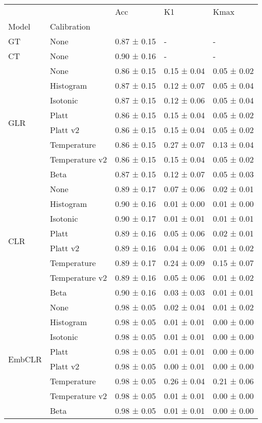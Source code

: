\begin{tabular}{lllll}
\toprule
 &  & Acc & K1 & Kmax \\
Model & Calibration &  &  &  \\
\midrule
GT & None & 0.87 ± 0.15 & - & - \\
\cline{1-5}
CT & None & 0.90 ± 0.16 & - & - \\
\cline{1-5}
\multirow[t]{8}{*}{GLR} & None & 0.86 ± 0.15 & 0.15 ± 0.04 & 0.05 ± 0.02 \\
 & Histogram & 0.87 ± 0.15 & 0.12 ± 0.07 & 0.05 ± 0.04 \\
 & Isotonic & 0.87 ± 0.15 & 0.12 ± 0.06 & 0.05 ± 0.04 \\
 & Platt & 0.86 ± 0.15 & 0.15 ± 0.04 & 0.05 ± 0.02 \\
 & Platt v2 & 0.86 ± 0.15 & 0.15 ± 0.04 & 0.05 ± 0.02 \\
 & Temperature & 0.86 ± 0.15 & 0.27 ± 0.07 & 0.13 ± 0.04 \\
 & Temperature v2 & 0.86 ± 0.15 & 0.15 ± 0.04 & 0.05 ± 0.02 \\
 & Beta & 0.87 ± 0.15 & 0.12 ± 0.07 & 0.05 ± 0.03 \\
\cline{1-5}
\multirow[t]{8}{*}{CLR} & None & 0.89 ± 0.17 & 0.07 ± 0.06 & 0.02 ± 0.01 \\
 & Histogram & 0.90 ± 0.16 & 0.01 ± 0.00 & 0.01 ± 0.00 \\
 & Isotonic & 0.90 ± 0.17 & 0.01 ± 0.01 & 0.01 ± 0.01 \\
 & Platt & 0.89 ± 0.16 & 0.05 ± 0.06 & 0.02 ± 0.01 \\
 & Platt v2 & 0.89 ± 0.16 & 0.04 ± 0.06 & 0.01 ± 0.02 \\
 & Temperature & 0.89 ± 0.17 & 0.24 ± 0.09 & 0.15 ± 0.07 \\
 & Temperature v2 & 0.89 ± 0.16 & 0.05 ± 0.06 & 0.01 ± 0.02 \\
 & Beta & 0.90 ± 0.16 & 0.03 ± 0.03 & 0.01 ± 0.01 \\
\cline{1-5}
\multirow[t]{8}{*}{EmbCLR} & None & 0.98 ± 0.05 & 0.02 ± 0.04 & 0.01 ± 0.02 \\
 & Histogram & 0.98 ± 0.05 & 0.01 ± 0.01 & 0.00 ± 0.00 \\
 & Isotonic & 0.98 ± 0.05 & 0.01 ± 0.01 & 0.00 ± 0.00 \\
 & Platt & 0.98 ± 0.05 & 0.01 ± 0.01 & 0.00 ± 0.00 \\
 & Platt v2 & 0.98 ± 0.05 & 0.00 ± 0.01 & 0.00 ± 0.00 \\
 & Temperature & 0.98 ± 0.05 & 0.26 ± 0.04 & 0.21 ± 0.06 \\
 & Temperature v2 & 0.98 ± 0.05 & 0.01 ± 0.01 & 0.00 ± 0.00 \\
 & Beta & 0.98 ± 0.05 & 0.01 ± 0.01 & 0.00 ± 0.00 \\
\cline{1-5}
\bottomrule
\end{tabular}
